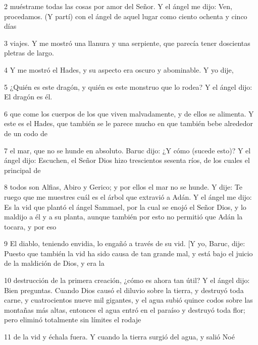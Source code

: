 \par 2 muéstrame todas las cosas por amor del Señor. Y el ángel me dijo: Ven, procedamos. (Y partí) con el ángel de aquel lugar como ciento ochenta y cinco días

\par 3 viajes. Y me mostró una llanura y una serpiente, que parecía tener doscientas pletras de largo.

\par 4 Y me mostró el Hades, y su aspecto era oscuro y abominable. Y yo dije,

\par 5 ¿Quién es este dragón, y quién es este monstruo que lo rodea? Y el ángel dijo: El dragón es él.

\par 6 que come los cuerpos de los que viven malvadamente, y de ellos se alimenta. Y este es el Hades, que también se le parece mucho en que también bebe alrededor de un codo de

\par 7 el mar, que no se hunde en absoluto. Baruc dijo: ¿Y cómo (sucede esto)? Y el ángel dijo: Escuchen, el Señor Dios hizo trescientos sesenta ríos, de los cuales el principal de

\par 8 todos son Alfias, Abiro y Gerico; y por ellos el mar no se hunde. Y dije: Te ruego que me muestres cuál es el árbol que extravió a Adán. Y el ángel me dijo: Es la vid que plantó el ángel Sammael, por la cual se enojó el Señor Dios, y lo maldijo a él y a su planta, aunque también por esto no permitió que Adán la tocara, y por eso

\par 9 El diablo, teniendo envidia, lo engañó a través de su vid. [Y yo, Baruc, dije: Puesto que también la vid ha sido causa de tan grande mal, y está bajo el juicio de la maldición de Dios, y era la

\par 10 destrucción de la primera creación, ¿cómo es ahora tan útil? Y el ángel dijo: Bien preguntas. Cuando Dios causó el diluvio sobre la tierra, y destruyó toda carne, y cuatrocientos nueve mil gigantes, y el agua subió quince codos sobre las montañas más altas, entonces el agua entró en el paraíso y destruyó toda flor; pero eliminó totalmente sin límites el rodaje

\par 11 de la vid y échala fuera. Y cuando la tierra surgió del agua, y salió Noé

